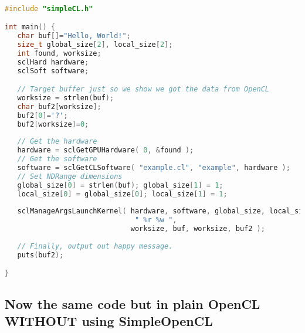 \documentclass{report}
\begin{document}
\begin{lstlisting}[language=c]

#include "simpleCL.h"

int main() {
   char buf[]="Hello, World!";
   size_t global_size[2], local_size[2];
   int found, worksize;
   sclHard hardware;
   sclSoft software;

   // Target buffer just so we show we got the data from OpenCL
   worksize = strlen(buf);
   char buf2[worksize];
   buf2[0]='?';
   buf2[worksize]=0;
    
   // Get the hardware
   hardware = sclGetGPUHardware( 0, &found );
   // Get the software
   software = sclGetCLSoftware( "example.cl", "example", hardware );
   // Set NDRange dimensions
   global_size[0] = strlen(buf); global_size[1] = 1;
   local_size[0] = global_size[0]; local_size[1] = 1;
    
   sclManageArgsLaunchKernel( hardware, software, global_size, local_size,
                               " %r %w ",
                              worksize, buf, worksize, buf2 );
    
   // Finally, output out happy message.
   puts(buf2);

}
\end{lstlisting}

\subsection{Now the same code but in plain OpenCL WITHOUT using SimpleOpenCL}
\end{document}
